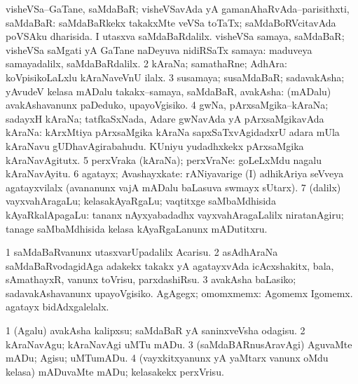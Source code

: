 \bentry
{}
\gl{\nA}
\bmng
\bnum
{} 
\banum
{} visheVSa--GaTane, saMdaBaR; visheVSavAda yA gamanAhaRvAda--parisithxti, saMdaBaR:  saMdaBaRkekx takakxMte veVSa toTaTx; saMdaBoRVcitavAda poVSAku dharisida.  I utasxva saMdaBaRdalilx. 
 visheVSa samaya, saMdaBaR; visheVSa saMgati yA GaTane naDeyuva nidiRSaTx samaya:  maduveya samayadalilx, saMdaBaRdalilx. 
\eanum
\numie
\num{2} kAraNa; samathaRne; AdhAra:  koVpisikoLaLxlu kAraNaveVnU ilalx. 
\num{3} susamaya; susaMdaBaR; sadavakAsha; yAvudeV kelasa mADalu takakx--samaya, saMdaBaR, avakAsha:  (mADalu) avakAshavanunx paDeduko, upayoVgisiko. 
\num{4} gwNa, pArxsaMgika--kAraNa; sadayxH kAraNa; tatfkaSxNada, Adare gwNavAda yA pArxsaMgikavAda kAraNa:  kArxMtiya pArxsaMgika kAraNa sapxSaTxvAgidadxrU adara mUla kAraNavu gUDhavAgirabahudu.  KUniyu yudadhxkekx pArxsaMgika kAraNavAgitutx. 
\num{5} perxVraka (kAraNa); perxVraNe:  goLeLxMdu nagalu kAraNavAyitu. 
\num{6} agatayx; Avashayxkate:  rANiyavarige (I) adhikAriya seVveya agatayxvilalx (avananunx vajA mADalu baLasuva swmayx sUtarx). 
\num{7} (\bava dalilx) vayxvahAragaLu; kelasakAyaRgaLu; vaqtitxge saMbaMdhisida kAyaRkalApagaLu:  tananx nAyxyabadadhx vayxvahAragaLalilx niratanAgiru; tanage saMbaMdhisida kelasa kAyaRgaLanunx mADutitxru. 
\enum
\emng

\noindent
\gl{\pagu}
\bmng
\bnum
\num{1}  saMdaBaRvanunx utasxvarUpadalilx Acarisu. 
\num{2}  asAdhAraNa saMdaBaRvodagidAga adakekx takakx yA agatayxvAda icAcxshakitx, bala, sAmathayxR, \mo vanunx toVrisu, parxdashiRsu. 
\num{3}  avakAsha baLasiko; sadavakAshavanunx upayoVgisiko. 
  
\banum
{} AgAgegx; omomxmemx: Agomemx Igomemx. 
 agatayx bidAdxgalelalx. 
\eanum
\numie
\enum
\emng
\eentry

\bentry
{}
\gl{\sakirx}
\bmng
\bnum
\num{1} (Agalu) avakAsha kalipxsu; saMdaBaR yA saninxveVsha odagisu. 
\num{2} kAraNavAgu; kAraNavAgi uMTu mADu. 
\num{3} (saMdaBARnusAravAgi) AguvaMte mADu; Agisu; uMTumADu. 
\num{4} (vayxkitxyanunx yA yaMtarx \mo vanunx oMdu kelasa) mADuvaMte mADu; kelasakekx perxVrisu. 
\enum
\emng
\eentry

